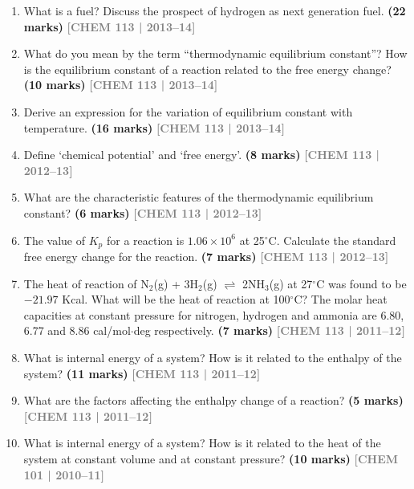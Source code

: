 \documentclass[12pt,a3paper]{article}
\newcommand{\yr}[1]{\hfill\textcolor{gray}{\small\textbf{[#1]}}}
\newcommand{\mk}[1]{\textcolor{orange!70!black}{\small\textbf{(#1 marks)}}}
\begin{document}
\begin{enumerate}
\item What is a fuel? Discuss the prospect of hydrogen as next generation fuel. \mk{22}
\yr{CHEM 113 | 2013--14}



\item What do you mean by the term ``thermodynamic equilibrium constant''? How is the equilibrium constant of a reaction related to the free energy change? \mk{10}
\yr{CHEM 113 | 2013--14}



\item Derive an expression for the variation of equilibrium constant with temperature. \mk{16}
\yr{CHEM 113 | 2013--14}



\item Define `chemical potential' and `free energy'. \mk{8}
\yr{CHEM 113 | 2012--13}



\item What are the characteristic features of the thermodynamic equilibrium constant? \mk{6}
\yr{CHEM 113 | 2012--13}



\item The value of $K_p$ for a reaction is $1.06 \times 10^6$ at 25$^\circ$C. Calculate the standard free energy change for the reaction. \mk{7}
\yr{CHEM 113 | 2012--13}



\item The heat of reaction of N$_2$(g) + 3H$_2$(g) $\rightleftharpoons$ 2NH$_3$(g) at 27$^\circ$C was found to be $-21.97$ Kcal. What will be the heat of reaction at 100$^\circ$C? The molar heat capacities at constant pressure for nitrogen, hydrogen and ammonia are 6.80, 6.77 and 8.86 cal/mol$\cdot$deg respectively. \mk{7}
\yr{CHEM 113 | 2011--12}



\item What is internal energy of a system? How is it related to the enthalpy of the system? \mk{11}
\yr{CHEM 113 | 2011--12}



\item What are the factors affecting the enthalpy change of a reaction? \mk{5}
\yr{CHEM 113 | 2011--12}



\item What is internal energy of a system? How is it related to the heat of the system at constant volume and at constant pressure? \mk{10}
\yr{CHEM 101 | 2010--11}




\end{enumerate}
\end{document}
